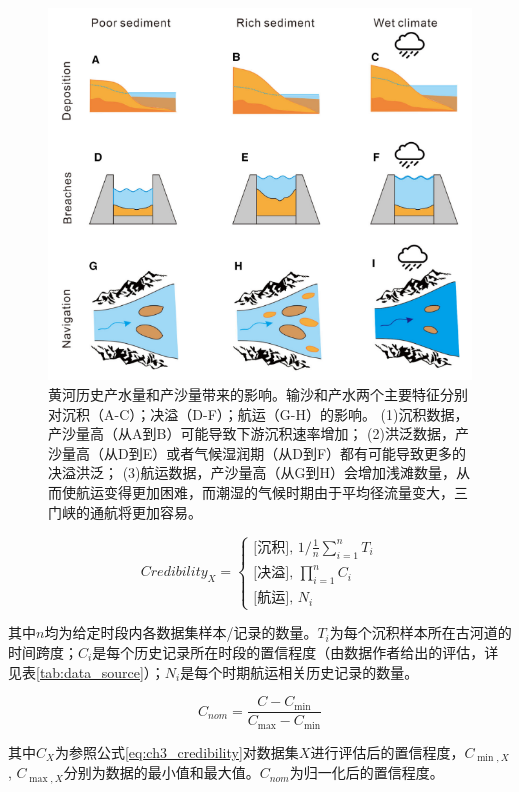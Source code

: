 \begin{figure}[htb] %
    \centering
    \includegraphics[width=\textwidth]{img/ch3/ch3_impacts_diagram.png}
    \caption[黄河历史产水量和产沙量带来的影响]{黄河历史产水量和产沙量带来的影响。输沙和产水两个主要特征分别对沉积（A-C）；决溢（D-F）；航运（G-H）的影响。
    (1)沉积数据，产沙量高（从A到B）可能导致下游沉积速率增加\cite{xu2003a}；
    (2)洪泛数据，产沙量高（从D到E）或者气候湿润期（从D到F）都有可能导致更多的决溢洪泛\cite{chen2012}；
    (3)航运数据，产沙量高（从G到H）会增加浅滩数量，从而使航运变得更加困难，而潮湿的气候时期由于平均径流量变大，三门峡的通航将更加容易\cite{WangShouChun1993}。}\label{fig:ch3:impacts_diagram}
\end{figure}



\begin{equation}
    \label{eq:ch3_credibility}
    Credibility_X = 
    \left\{\begin{array}{l}
        \text{[沉积], } 1 / \frac{1}{n} \sum_{i=1}^n T_i\\
        \text{[决溢], } \prod_{i=1}^n C_i\\
        \text{[航运], } N_i
    \end{array}\right.
\end{equation}

其中$n$均为给定时段内各数据集样本/记录的数量。$T_i$为每个沉积样本所在古河道的时间跨度；$C_i$是每个历史记录所在时段的置信程度（由数据作者给出的评估，详见表\ref{tab:data_source}）；$N_i$是每个时期航运相关历史记录的数量。

\begin{equation}
    \label{eq:ch3_normalize}
    C_{nom}=\frac{C-C_{\min}}{C_{\max}-C_{\min}}
\end{equation}

其中$C_{X}$为参照公式\ref{eq:ch3_credibility}对数据集$X$进行评估后的置信程度，$C_{\min, X}$, $C_{\max, X}$分别为数据的最小值和最大值。$C_{nom}$为归一化后的置信程度。
